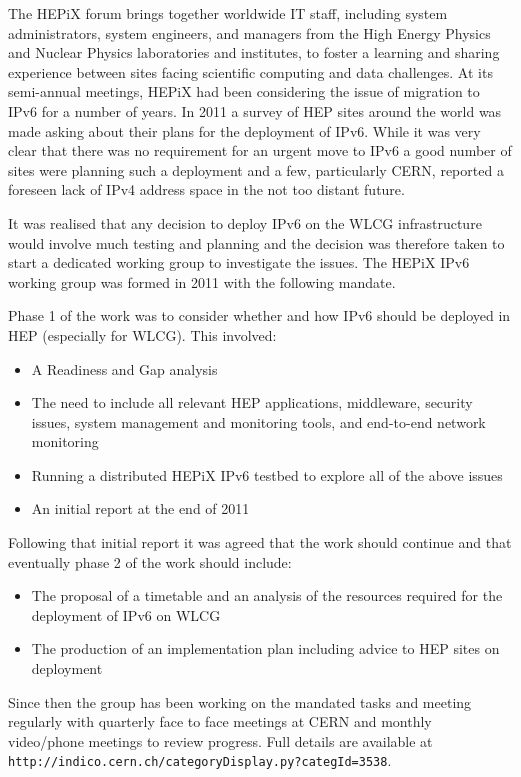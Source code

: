 The HEPiX forum brings together worldwide IT staff, including system administrators, system engineers, and managers from the High Energy Physics and Nuclear Physics laboratories and institutes, to foster a learning and sharing experience between sites facing scientific computing and data challenges. At its semi-annual meetings, HEPiX had been considering the issue of migration to IPv6 for a number of years. In 2011 a survey of HEP sites around the world was made asking about their plans for the deployment of IPv6. While it was very clear that there was no requirement for an urgent move to IPv6 a good number of sites were planning such a deployment and a few, particularly CERN, reported a foreseen lack of IPv4 address space in the not too distant future.

It was realised that any decision to deploy IPv6 on the WLCG infrastructure would involve much testing and planning and the decision was therefore taken to start a dedicated working group to investigate the issues. The HEPiX IPv6 working group was formed in 2011 with the following mandate.

Phase 1 of the work was to consider whether and how IPv6 should be deployed in HEP (especially for WLCG). This involved:
\begin {itemize}
\item A Readiness and Gap analysis
\item The need to include all relevant HEP applications, middleware, security issues, system management and monitoring tools, and end-to-end network monitoring
\item Running a distributed HEPiX IPv6 testbed to explore all of the above issues
\item An initial report at the end of 2011
\end {itemize}	
Following that initial report it was agreed that the work should continue and that eventually phase 2 of the work should include:
\begin {itemize}
\item The proposal of a timetable and an analysis of the resources required for the deployment of IPv6 on WLCG
\item The production of an implementation plan including advice to HEP sites on deployment
\end {itemize}

Since then the group has been working on the mandated tasks and meeting regularly with quarterly face to face meetings at CERN and monthly video/phone meetings to review progress. Full details are available at {\tt http://indico.cern.ch/categoryDisplay.py?categId=3538}.


